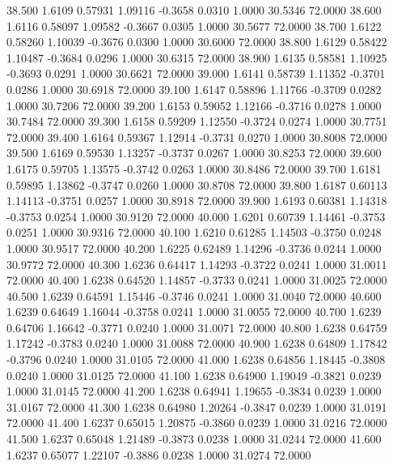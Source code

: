   38.500   1.6109   0.57931   1.09116  -0.3658   0.0310   1.0000  30.5346  72.0000
  38.600   1.6116   0.58097   1.09582  -0.3667   0.0305   1.0000  30.5677  72.0000
  38.700   1.6122   0.58260   1.10039  -0.3676   0.0300   1.0000  30.6000  72.0000
  38.800   1.6129   0.58422   1.10487  -0.3684   0.0296   1.0000  30.6315  72.0000
  38.900   1.6135   0.58581   1.10925  -0.3693   0.0291   1.0000  30.6621  72.0000
  39.000   1.6141   0.58739   1.11352  -0.3701   0.0286   1.0000  30.6918  72.0000
  39.100   1.6147   0.58896   1.11766  -0.3709   0.0282   1.0000  30.7206  72.0000
  39.200   1.6153   0.59052   1.12166  -0.3716   0.0278   1.0000  30.7484  72.0000
  39.300   1.6158   0.59209   1.12550  -0.3724   0.0274   1.0000  30.7751  72.0000
  39.400   1.6164   0.59367   1.12914  -0.3731   0.0270   1.0000  30.8008  72.0000
  39.500   1.6169   0.59530   1.13257  -0.3737   0.0267   1.0000  30.8253  72.0000
  39.600   1.6175   0.59705   1.13575  -0.3742   0.0263   1.0000  30.8486  72.0000
  39.700   1.6181   0.59895   1.13862  -0.3747   0.0260   1.0000  30.8708  72.0000
  39.800   1.6187   0.60113   1.14113  -0.3751   0.0257   1.0000  30.8918  72.0000
  39.900   1.6193   0.60381   1.14318  -0.3753   0.0254   1.0000  30.9120  72.0000
  40.000   1.6201   0.60739   1.14461  -0.3753   0.0251   1.0000  30.9316  72.0000
  40.100   1.6210   0.61285   1.14503  -0.3750   0.0248   1.0000  30.9517  72.0000
  40.200   1.6225   0.62489   1.14296  -0.3736   0.0244   1.0000  30.9772  72.0000
  40.300   1.6236   0.64417   1.14293  -0.3722   0.0241   1.0000  31.0011  72.0000
  40.400   1.6238   0.64520   1.14857  -0.3733   0.0241   1.0000  31.0025  72.0000
  40.500   1.6239   0.64591   1.15446  -0.3746   0.0241   1.0000  31.0040  72.0000
  40.600   1.6239   0.64649   1.16044  -0.3758   0.0241   1.0000  31.0055  72.0000
  40.700   1.6239   0.64706   1.16642  -0.3771   0.0240   1.0000  31.0071  72.0000
  40.800   1.6238   0.64759   1.17242  -0.3783   0.0240   1.0000  31.0088  72.0000
  40.900   1.6238   0.64809   1.17842  -0.3796   0.0240   1.0000  31.0105  72.0000
  41.000   1.6238   0.64856   1.18445  -0.3808   0.0240   1.0000  31.0125  72.0000
  41.100   1.6238   0.64900   1.19049  -0.3821   0.0239   1.0000  31.0145  72.0000
  41.200   1.6238   0.64941   1.19655  -0.3834   0.0239   1.0000  31.0167  72.0000
  41.300   1.6238   0.64980   1.20264  -0.3847   0.0239   1.0000  31.0191  72.0000
  41.400   1.6237   0.65015   1.20875  -0.3860   0.0239   1.0000  31.0216  72.0000
  41.500   1.6237   0.65048   1.21489  -0.3873   0.0238   1.0000  31.0244  72.0000
  41.600   1.6237   0.65077   1.22107  -0.3886   0.0238   1.0000  31.0274  72.0000

